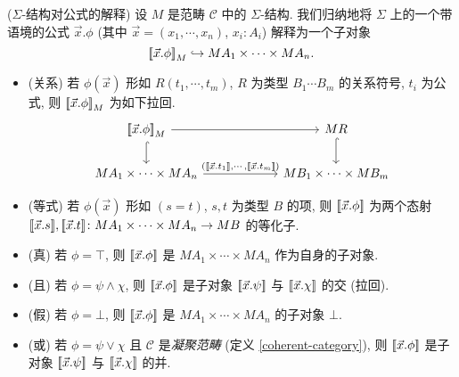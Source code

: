 \begin{definition}
	[label={interpretation-formolae}]
	{($\Sigma$-结构对公式的解释)}
	设 $M$ 是范畴 $\mathcal C$ 中的 $\Sigma$-结构.
	我们归纳地将 $\Sigma$ 上的一个带语境的公式 $\vec x.\phi$ (其中 $\vec x= (x_1,\cdots,x_n)$, $x_i\colon A_i$) 解释为一个子对象
	$$
	{[\![\vec x.\phi]\!]}_M \hookrightarrow MA_1 \times \cdots \times MA_n.
	$$
	\begin{itemize}
		\item (关系) 若 $\phi(\vec x)$ 形如 $R(t_1,\cdots,t_m)$, $R$ 为类型 $B_1\cdots B_m$ 的关系符号, $t_i$ 为公式, 则
		${[\![\vec x.\phi]\!]}_M$ 为如下拉回.
		\[\begin{tikzcd}[ampersand replacement=\&,column sep=6em]
			{\interpretation{\vec x.\phi}_M} \& MR \\
			{MA_1\times\cdots\times MA_n} \& {MB_1\times\cdots\times MB_m}
			\arrow["{(\interpretation{\vec x.t_1},\cdots,\interpretation{\vec x.t_m})}", from=2-1, to=2-2]
			\arrow[hook, from=1-1, to=2-1]
			\arrow[from=1-1, to=1-2]
			\arrow[hook, from=1-2, to=2-2]
		\end{tikzcd}\]
		\item (等式) 若 $\phi(\vec x)$ 形如 $(s=t)$, $s,t$ 为类型 $B$ 的项, 则 ${[\![\vec x.\phi]\!]}$ 为两个态射 ${[\![\vec x.s]\!]},{[\![\vec x.t]\!]}\colon MA_1\times\cdots\times MA_n \to MB$ 的等化子.
		\item (真) 若 $\phi = \top$, 则 ${[\![\vec x.\phi]\!]}$ 是 $MA_1\times\cdots\times MA_n$ 作为自身的子对象.
		\item (且) 若 $\phi = \psi \wedge \chi$, 则 ${[\![\vec x.\phi]\!]}$ 是子对象 ${[\![\vec x.\psi]\!]}$ 与 ${[\![\vec x.\chi]\!]}$ 的交 (拉回).
		\item (假) 若 $\phi = \bot$, 则 ${[\![\vec x.\phi]\!]}$ 是 $MA_1\times\cdots\times MA_n$ 的子对象 $\bot$.
		\item (或) 若 $\phi = \psi \lor \chi$ 且 $\mathcal C$ 是\emph{凝聚范畴} (定义 \ref{coherent-category}),
		则 ${[\![\vec x.\phi]\!]}$ 是子对象 ${[\![\vec x.\psi]\!]}$ 与 ${[\![\vec x.\chi]\!]}$ 的并.

\end{itemize}
\end{definition}

